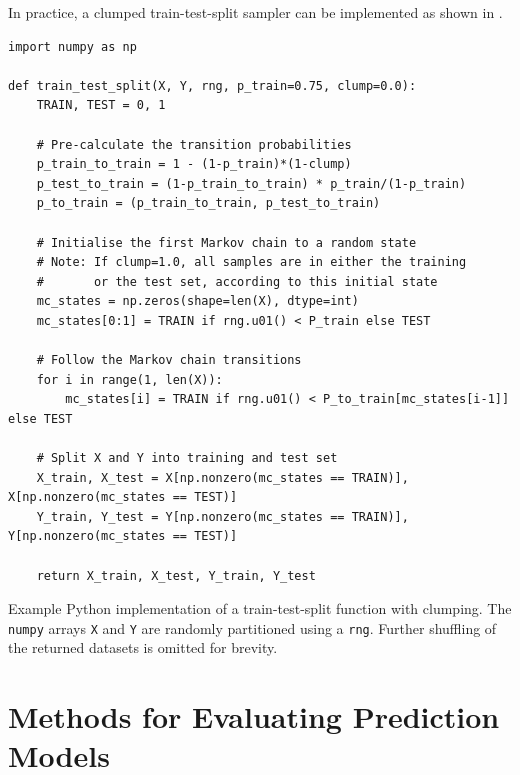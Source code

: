 \noindent In practice, a clumped train-test-split sampler can be implemented as shown in .

\begin{listing}[H]
    \capstart %
    \begin{verbatim}
import numpy as np
    
def train_test_split(X, Y, rng, p_train=0.75, clump=0.0):
    TRAIN, TEST = 0, 1

    # Pre-calculate the transition probabilities
    p_train_to_train = 1 - (1-p_train)*(1-clump)
    p_test_to_train = (1-p_train_to_train) * p_train/(1-p_train)
    p_to_train = (p_train_to_train, p_test_to_train)

    # Initialise the first Markov chain to a random state
    # Note: If clump=1.0, all samples are in either the training
    #       or the test set, according to this initial state
    mc_states = np.zeros(shape=len(X), dtype=int)
    mc_states[0:1] = TRAIN if rng.u01() < P_train else TEST

    # Follow the Markov chain transitions
    for i in range(1, len(X)):
        mc_states[i] = TRAIN if rng.u01() < P_to_train[mc_states[i-1]] else TEST

    # Split X and Y into training and test set
    X_train, X_test = X[np.nonzero(mc_states == TRAIN)], X[np.nonzero(mc_states == TEST)]
    Y_train, Y_test = Y[np.nonzero(mc_states == TRAIN)], Y[np.nonzero(mc_states == TEST)]

    return X_train, X_test, Y_train, Y_test
    \end{verbatim}
    \caption[Clumped train-test-split procedure]{Example Python implementation of a train-test-split function with clumping. The \texttt{numpy} arrays \texttt{X} and \texttt{Y} are randomly partitioned using a \texttt{rng}. Further shuffling of the returned datasets is omitted for brevity.}
    \label{exe:clumped-train-test}
\end{listing}

\section{Methods for Evaluating Prediction Models} \label{txt:model-criteria}

